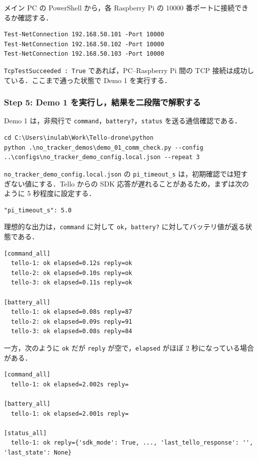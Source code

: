 メイン PC の PowerShell から，各 Raspberry Pi の 10000 番ポートに接続できるか確認する．

\begin{lstlisting}
Test-NetConnection 192.168.50.101 -Port 10000
Test-NetConnection 192.168.50.102 -Port 10000
Test-NetConnection 192.168.50.103 -Port 10000
\end{lstlisting}

\texttt{TcpTestSucceeded : True} であれば，PC--Raspberry Pi 間の TCP 接続は成功している．ここまで通った状態で Demo 1 を実行する．

\subsubsection{Step 5: Demo 1 を実行し，結果を二段階で解釈する}

Demo 1 は，非飛行で \texttt{command}，\texttt{battery?}，\texttt{status} を送る通信確認である．

\begin{lstlisting}
cd C:\Users\inulab\Work\Tello-drone\python
python .\no_tracker_demos\demo_01_comm_check.py --config ..\configs\no_tracker_demo_config.local.json --repeat 3
\end{lstlisting}

\texttt{no\_tracker\_demo\_config.local.json} の \texttt{pi\_timeout\_s} は，初期確認では短すぎない値にする．Tello からの SDK 応答が遅れることがあるため，まずは次のように 5 秒程度に設定する．

\begin{lstlisting}
"pi_timeout_s": 5.0
\end{lstlisting}

理想的な出力は，\texttt{command} に対して \texttt{ok}，\texttt{battery?} に対してバッテリ値が返る状態である．

\begin{lstlisting}
[command_all]
  tello-1: ok elapsed=0.12s reply=ok
  tello-2: ok elapsed=0.10s reply=ok
  tello-3: ok elapsed=0.11s reply=ok

[battery_all]
  tello-1: ok elapsed=0.08s reply=87
  tello-2: ok elapsed=0.09s reply=91
  tello-3: ok elapsed=0.08s reply=84
\end{lstlisting}

一方，次のように \texttt{ok} だが \texttt{reply} が空で，\texttt{elapsed} がほぼ 2 秒になっている場合がある．

\begin{lstlisting}
[command_all]
  tello-1: ok elapsed=2.002s reply=

[battery_all]
  tello-1: ok elapsed=2.001s reply=

[status_all]
  tello-1: ok reply={'sdk_mode': True, ..., 'last_tello_response': '', 'last_state': None}
\end{lstlisting}

